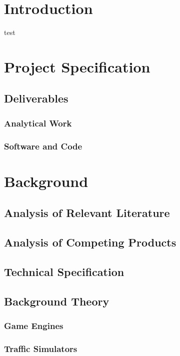 \documentclass[11pt]{article}
\begin{document}


\tableofcontents
\newpage

\section{Introduction}
test
\cite{10.1145/1497577.1497578}

\section{Project Specification}

\subsection{Deliverables}
\subsubsection{Analytical Work}
\subsubsection{Software and Code}



\section{Background}
\subsection{Analysis of Relevant Literature}
\subsection{Analysis of Competing Products}

\subsection{Technical Specification}

\subsection{Background Theory}
\subsubsection{Game Engines}
\subsubsection{Traffic Simulators}
\end{document}

